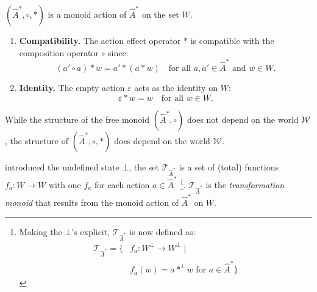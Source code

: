 \begin{propositionE}
	$(\hat{A}^{*}, \circ, \ast)$ is a monoid action of $\hat{A}^{*}$ on the set $W$.
\end{propositionE}
\begin{proofE}
\begin{enumerate}
    \item \textbf{Compatibility.}
          The action effect operator $\ast$ is compatible with the composition operator $\circ$ since:
          \begin{equation}
              (a' \circ a) \ast w = a' \ast (a \ast w) \quad \text{for all $a, a' \in \hat{A}^{*}$ and $w \in W$}.
          \end{equation}

    \item \textbf{Identity.}
          The empty action $\varepsilon$ acts as the identity on $W$:
          \begin{equation}
              \varepsilon \ast w = w \quad \text{for all } w \in W.
          \end{equation}
\end{enumerate}
\end{proofE}

While the structure of the free monoid $(\hat{A}^{*}, \circ)$ does not depend on the world $\mathscr{W}$, the structure of $(\hat{A}^{*}, \circ, \ast)$ does depend on the world $\mathscr{W}$.


 introduced the undefined state $\bot$, the set $\mathcal{T}_{\hat{A}^{*}}$ is a set of (total) functions $f_{a}: W \to W$ with one $f_{a}$ for each action $a \in \hat{A}^{*}$ \footnote{
Making the $\bot$'s explicit, $\mathcal{T}_{\hat{A}^{*}}$ is now defined as:
\begin{equation}
\begin{aligned}
    \mathcal{T}_{\hat{A}^{*}} = \{ & f_{a}: W^{\bot} \to W^{\bot} \mid                                \\
                                      & f_{a}(w) = a \ast^{\bot} w \text{ for $a \in \hat{A}^{*}$} \}
\end{aligned}
\end{equation}
}.
$\mathcal{T}_{\hat{A}^{*}}$ is the \emph{transformation monoid} that results from the monoid action of $\hat{A}^{*}$ on $W$.



